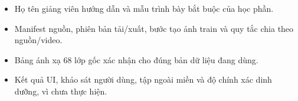 \documentclass[
  vietnamese,
  12pt,
  a4paper,
]{article}
\providecommand{\tightlist}{%
  \setlength{\itemsep}{0pt}\setlength{\parskip}{0pt}}
\begin{document}
\begin{itemize}
\tightlist
\item
  Họ tên giảng viên hướng dẫn và mẫu trình bày bắt buộc của học phần.
\item
  Manifest nguồn, phiên bản tải/xuất, bước tạo ảnh train và quy tắc chia
  theo nguồn/video.
\item
  Bảng ánh xạ 68 lớp gốc xác nhận cho đúng bản dữ liệu đang dùng.
\item
  Kết quả UI, khảo sát người dùng, tập ngoài miền và độ chính xác dinh
  dưỡng, vì chưa thực hiện.
\end{itemize}
\end{document}
